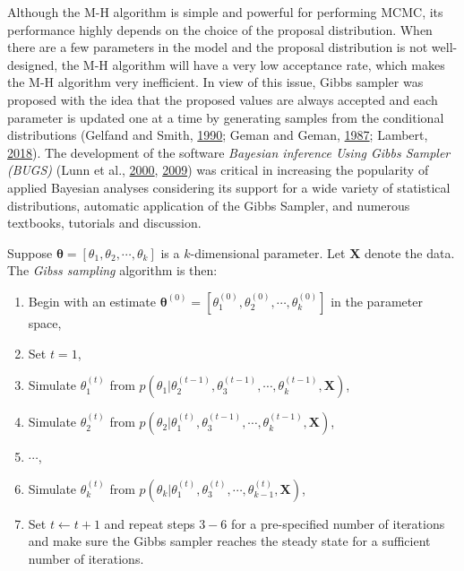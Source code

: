 \documentclass[12pt]{book}
\numberwithin{equation}{chapter}
\providecommand{\tightlist}{%
  \setlength{\itemsep}{0pt}\setlength{\parskip}{0pt}}
\begin{document}
Although the M-H algorithm is simple and powerful for performing MCMC, its performance highly depends on the choice of the proposal distribution. When there are a few parameters in the model and the proposal distribution is not well-designed, the M-H algorithm will have a very low acceptance rate, which makes the M-H algorithm very inefficient. In view of this issue, Gibbs sampler was proposed with the idea that the proposed values are always accepted and each parameter is updated one at a time by generating samples from the conditional distributions (Gelfand and Smith, \protect\hyperlink{ref-gelfand1990sampling}{1990}; Geman and Geman, \protect\hyperlink{ref-geman1987stochastic}{1987}; Lambert, \protect\hyperlink{ref-lambert2018student}{2018}). The development of the software \emph{Bayesian inference Using Gibbs Sampler (BUGS)} (Lunn et al., \protect\hyperlink{ref-lunn2000winbugs}{2000}, \protect\hyperlink{ref-lunn2009bugs}{2009}) was critical in increasing the popularity of applied Bayesian analyses considering its support for a wide variety of statistical distributions, automatic application of the Gibbs Sampler, and numerous textbooks, tutorials and discussion.

Suppose \(\mathbf{\theta} = [\theta_1, \theta_2, \cdots, \theta_k]\) is a \(k\)-dimensional parameter. Let \(\mathbf{X}\) denote the data. The \emph{Gibss sampling} algorithm is then:

\begin{enumerate}
\def\labelenumi{\arabic{enumi}.}
\tightlist
\item
  Begin with an estimate \(\mathbf{\theta}^{(0)} = [\theta_1^{(0)}, \theta_2^{(0)}, \cdots , \theta_k^{(0)}]\) in the parameter space,
\item
  Set \(t = 1\),
\item
  Simulate \(\theta_1^{(t)}\) from \(p(\theta_1|\theta_2^{(t-1)}, \theta_3^{(t-1)},\cdots , \theta_k^{(t-1)}, \mathbf{X})\),
\item
  Simulate \(\theta_2^{(t)}\) from \(p(\theta_2|\theta_1^{(t)}, \theta_3^{(t-1)},\cdots , \theta_k^{(t-1)}, \mathbf{X})\),
\item
  \(\cdots\),
\item
  Simulate \(\theta_k^{(t)}\) from \(p(\theta_k|\theta_1^{(t)}, \theta_3^{(t)},\cdots , \theta_{k-1}^{(t)}, \mathbf{X})\),
\item
  Set \(t \leftarrow t + 1\) and repeat steps \(3-6\) for a pre-specified number of iterations and make sure the Gibbs sampler reaches the steady state for a sufficient number of iterations.
\end{enumerate}
\end{document}
